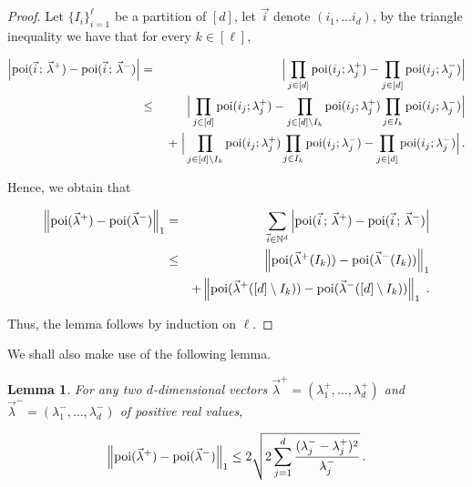 \documentclass[10pt]{article}
\newtheorem{lemma}[theorem]{Lemma}
\theoremstyle{definition}
\numberwithin{equation}{section}
\newcommand{\poi}{{\rm poi}}
\newcommand{\BEQN}{\begin{eqnarray}}\newcommand{\EEQN}{\end{eqnarray}}
\newcommand{\BPF}{\begin{proof}} \newcommand {\EPF}{\end{proof}}
\begin{document}
%
\def\DisvalLemPrf{
Let $\{I_i\}_{i=1}^{\ell}$ be a partition of $[d]$, let $\vec{i}$ denote $(i_1,\ldots i_d)$, by the triangle inequality we have that for every $k\in [\ell]$,
%

\begin{eqnarray}
\left|\poi(\vec{i}\,;\,\vec{\lambda}^+) - \poi(\vec{i}\,;\,\vec{\lambda}^-)\right|
   &=& \Big|\prod_{j\in[d]} \poi(i_j;\lambda_j^+) - \prod_{j\in[d]} \poi(i_j;\lambda_j^-)\Big| \\
   &\leq& \Big|\prod_{j\in[d]} \poi(i_j;\lambda_j^+) - \prod_{j\in[d]\setminus I_k} \poi(i_j;\lambda_j^+) \prod_{j\in I_k} \poi(i_j;\lambda_j^-)\Big| \\ &&\;+\;
    \Big|\prod_{j\in[d]\setminus I_k} \poi(i_j;\lambda_j^+) \prod_{j\in I_k} \poi(i_j;\lambda_j^-) - \prod_{j\in[d]} \poi(i_j;\lambda_j^-)\Big|\,.
\end{eqnarray}










%
Hence, we obtain that
%

\begin{eqnarray}
\left\|\poi(\vec{\lambda}^+) - \poi(\vec{\lambda}^-) \right\|_1
   &=& \sum_{\vec{i} \in \mathbb{N}^d} \left|\poi(\vec{i}\,;\,\vec{\lambda}^+) - \poi(\vec{i}\,;\,\vec{\lambda}^-)\right| \\
   &\leq& \left\|\poi(\vec{\lambda}^+(I_k))
      - \poi(\vec{\lambda}^-(I_k)) \right\|_1 \\
   && + \left\|\poi(\vec{\lambda}^+([d]\setminus I_k))
      - \poi(\vec{\lambda}^-([d] \setminus I_k)) \right\|_1 \; .
\end{eqnarray}












%
Thus, the lemma follows by induction on $\ell$.
}
%

%

\BPF
\DisvalLemPrf
\EPF

%

%
\noindent
We shall also make use of the following lemma.
\begin{lemma} \label{dis.lem}
%
For any two $d$-dimensional vectors $\vec{\lambda}^+ = (\lambda^+_1,\ldots,\lambda^+_d)$ and
$\vec{\lambda}^- = (\lambda^-_1,\ldots,\lambda^-_d)$ of positive real values,
%

\BEQN
\left\|\poi(\vec{\lambda}^+) - \poi(\vec{\lambda}^-) \right\|_1
   \leq 2\sqrt{2\sum_{j=1}^d \frac{(\lambda_j^- - \lambda_j^+)^2}{\lambda_j^-}}\,.
\EEQN






%
\end{lemma}
\end{document}
